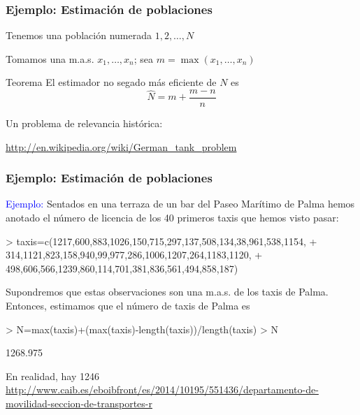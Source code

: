\documentclass[12pt,t]{beamer}
\newcommand{\blue}[1]{\textcolor{blue}{#1}}
\theoremstyle{plain}
\theoremstyle{definition}
\begin{document}
\begin{frame}
\frametitle{Ejemplo: Estimación de poblaciones }

Tenemos una población numerada $1,2,\ldots,N$\medskip

Tomamos  una m.a.s. $x_1,\ldots,x_n$; sea
$m=\max(x_1,\ldots,x_n)$
\medskip

\begin{block}{Teorema}
El estimador no segado más eficiente de $N$ es
$$
\widehat{N}=m+\frac{m-n}{n}
$$
\end{block}
\bigskip


Un problema de relevancia histórica:

{\scriptsize \url{http://en.wikipedia.org/wiki/German_tank_problem}}

\end{frame}



\begin{frame}[fragile]
\frametitle{Ejemplo: Estimación de poblaciones }
\vspace*{-2ex}

\blue{Ejemplo:}
Sentados en una terraza de un bar del Paseo Marítimo de Palma hemos anotado el número de licencia de los 40 primeros taxis que hemos visto pasar:
\vspace*{-1ex}


\begin{Schunk}
\begin{Sinput}
> taxis=c(1217,600,883,1026,150,715,297,137,508,134,38,961,538,1154,
+         314,1121,823,158,940,99,977,286,1006,1207,264,1183,1120,
+         498,606,566,1239,860,114,701,381,836,561,494,858,187)
\end{Sinput}
\end{Schunk}

\vspace*{-1ex}

Supondremos que estas observaciones son  una m.a.s. de los taxis de Palma. Entonces, estimamos  que el número de taxis de Palma es
\vspace*{-1ex}
\begin{Schunk}
\begin{Sinput}
> N=max(taxis)+(max(taxis)-length(taxis))/length(taxis)
> N
\end{Sinput}
\begin{Soutput}
[1] 1268.975
\end{Soutput}
\end{Schunk}
\vspace*{-1ex}
En realidad, hay  1246 
\medskip
{\tiny \url{http://www.caib.es/eboibfront/es/2014/10195/551436/departamento-de-movilidad-seccion-de-transportes-r}
}
\end{frame}
\end{document}
